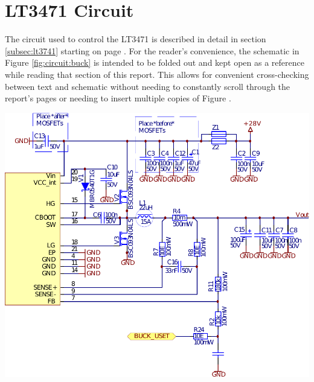{%
    \clearpage
    \pdfpagewidth
    \textwidth
    \addtolength{\textwidth}{50mm}

    \section{LT3471 Circuit}
    \label{appendix:lt3741:circuit}

    \begin{minipage}[b]{.5\textwidth}
        The   circuit    used   to    control   the   LT3471    is   described
        in   detail   in   section  \ref{subsec:lt3741}   starting   on   page
        \pageref{subsec:lt3741}. For the  reader's convenience,  the schematic
        in Figure \ref{fig:circuit:buck} is intended to be folded out and kept
        open as  a reference while  reading that section of  this report. This
        allows  for  convenient  cross-checking  between  text  and  schematic
        without needing  to constantly  scroll through  the report's  pages or
        needing to insert multiple copies of Figure \label{fig:circuit:buck}.
    \end{minipage}%
    \begin{minipage}[b]{.5\textwidth}
        \center
        \includegraphics[width=.67\textwidth]{images/circuit/buck.pdf}
        \label{fig:circuit:buck}
    \end{minipage}

\clearpage
}

